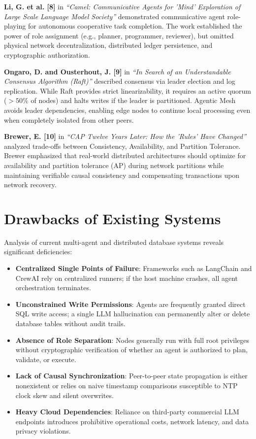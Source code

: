 \documentclass[12pt,a4paper]{report}
\begin{document}
\noindent
\textbf{Li, G. et al. [8]} in \textit{“Camel: Communicative Agents for 'Mind' Exploration of Large Scale Language Model Society”} demonstrated communicative agent role-playing for autonomous cooperative task completion. The work established the power of role assignment (e.g., planner, programmer, reviewer), but omitted physical network decentralization, distributed ledger persistence, and cryptographic authorization.

\noindent
\textbf{Ongaro, D. and Ousterhout, J. [9]} in \textit{“In Search of an Understandable Consensus Algorithm (Raft)”} described consensus via leader election and log replication. While Raft provides strict linearizability, it requires an active quorum ($>50\%$ of nodes) and halts writes if the leader is partitioned. Agentic Mesh avoids leader dependencies, enabling edge nodes to continue local processing even when completely isolated from other peers.

\noindent
\textbf{Brewer, E. [10]} in \textit{“CAP Twelve Years Later: How the 'Rules' Have Changed”} analyzed trade-offs between Consistency, Availability, and Partition Tolerance. Brewer emphasized that real-world distributed architectures should optimize for availability and partition tolerance (AP) during network partitions while maintaining verifiable causal consistency and compensating transactions upon network recovery.

\section{Drawbacks of Existing Systems}
Analysis of current multi-agent and distributed database systems reveals significant deficiencies:
\begin{itemize}[leftmargin=*,itemsep=2pt]
    \item \textbf{Centralized Single Points of Failure}: Frameworks such as LangChain and CrewAI rely on centralized runners; if the host machine crashes, all agent orchestration terminates.
    \item \textbf{Unconstrained Write Permissions}: Agents are frequently granted direct SQL write access; a single LLM hallucination can permanently alter or delete database tables without audit trails.
    \item \textbf{Absence of Role Separation}: Nodes generally run with full root privileges without cryptographic verification of whether an agent is authorized to plan, validate, or execute.
    \item \textbf{Lack of Causal Synchronization}: Peer-to-peer state propagation is either nonexistent or relies on naive timestamp comparisons susceptible to NTP clock skew and silent overwrites.
    \item \textbf{Heavy Cloud Dependencies}: Reliance on third-party commercial LLM endpoints introduces prohibitive operational costs, network latency, and data privacy violations.
\end{itemize}
\end{document}
